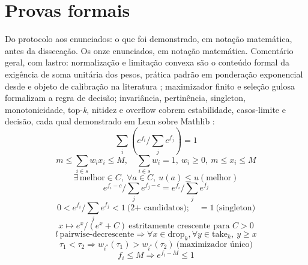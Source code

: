 \chapter{Provas formais}
Do protocolo aos enunciados: o que foi demonstrado, em notação matemática, antes da dissecação.
Os onze enunciados, em notação matemática. Comentário geral, com lastro: normalização e limitação convexa são o conteúdo formal da exigência de soma unitária dos pesos, prática padrão em ponderação exponencial desde \cite{vaswani2017} e objeto de calibração na literatura \cite{komisarenko2024,xuan2025}; maximizador finito e seleção gulosa formalizam a regra de decisão; invariância, pertinência, singleton, monotonicidade, top-\textit{k}, nitidez e overflow cobrem estabilidade, casos-limite e decisão, cada qual demonstrado em Lean sobre Mathlib \cite{moura2021,mathlib2020}:
\begin{equation}
\sum_i\left(e^{f_i}/\sum_j e^{f_j}\right)=1 \tag{T1}
\end{equation}
\begin{equation}
m\leq\sum_{i\in s}w_ix_i\leq M,\quad \sum_{i\in s}w_i=1,\ w_i\geq0,\ m\leq x_i\leq M \tag{T2/T6}
\end{equation}
\begin{equation}
\exists\,\text{melhor}\in C,\ \forall a\in C,\ u(a)\leq u(\text{melhor}) \tag{T3}
\end{equation}
\begin{equation}
e^{f_i-c}/\sum_j e^{f_j-c}=e^{f_i}/\sum_j e^{f_j} \tag{T4}
\end{equation}
\begin{equation}
0<e^{f_i}/\sum_j e^{f_j}<1\ \text{(2+ candidatos)};\quad =1\ \text{(singleton)} \tag{T5/T7}
\end{equation}
\begin{equation}
x\mapsto e^x/(e^x+C)\ \text{estritamente crescente para }C>0 \tag{T8}
\end{equation}
\begin{equation}
l\ \text{pairwise-decrescente}\Rightarrow\forall x\in\text{drop}_k,\forall y\in\text{take}_k,\ y\geq x \tag{T9}
\end{equation}
\begin{equation}
\tau_1<\tau_2\Rightarrow w_{i^*}(\tau_1)>w_{i^*}(\tau_2)\ \text{(maximizador único)} \tag{T10}
\end{equation}
\begin{equation}
f_i\leq M\Rightarrow e^{f_i-M}\leq1 \tag{T11}
\end{equation}
